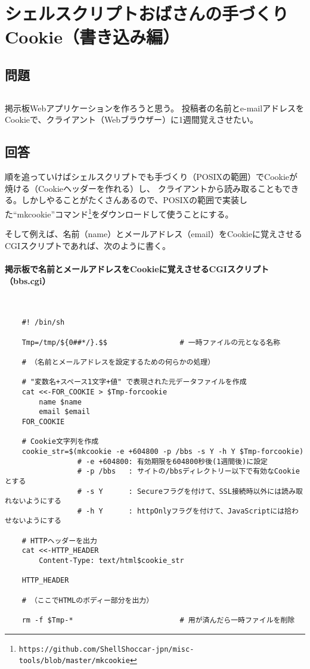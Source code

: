 \section{シェルスクリプトおばさんの手づくりCookie（書き込み編）}
\label{recipe:make_cookie}

\subsection*{問題}
\noindent
$\!\!\!\!\!$
\begin{grshfboxit}{160.0mm}
	掲示板Webアプリケーションを作ろうと思う。
	投稿者の名前とe-mailアドレスをCookieで、クライアント（Webブラウザー）に1週間覚えさせたい。
\end{grshfboxit}

\subsection*{回答}
順を追っていけばシェルスクリプトでも手づくり（POSIXの範囲）でCookieが焼ける（Cookieヘッダーを作れる）し、
クライアントから読み取ることもできる。しかしやることがたくさんあるので、POSIXの範囲で実装した``mkcookie''コマンド\footnote{\verb|https://github.com/ShellShoccar-jpn/misc-tools/blob/master/mkcookie|}をダウンロードして使うことにする。

そして例えば、名前（name）とメールアドレス（email）をCookieに覚えさせるCGIスクリプトであれば、次のように書く。
\paragraph{掲示板で名前とメールアドレスをCookieに覚えさせるCGIスクリプト（bbs.cgi）} 　\\
\begin{frameboxit}{160.0mm}
\begin{verbatim}
	#! /bin/sh
	
	Tmp=/tmp/${0##*/}.$$                 # 一時ファイルの元となる名称
	
	# （名前とメールアドレスを設定するための何らかの処理）
	
	# "変数名+スペース1文字+値" で表現された元データファイルを作成
	cat <<-FOR_COOKIE > $Tmp-forcookie
	    name $name
	    email $email
	FOR_COOKIE
	
	# Cookie文字列を作成
	cookie_str=$(mkcookie -e +604800 -p /bbs -s Y -h Y $Tmp-forcookie)
	             # -e +604800: 有効期限を604800秒後(1週間後)に設定
	             # -p /bbs   : サイトの/bbsディレクトリー以下で有効なCookieとする
	             # -s Y      : Secureフラグを付けて、SSL接続時以外には読み取れないようにする
	             # -h Y      : httpOnlyフラグを付けて、JavaScriptには拾わせないようにする
	
	# HTTPヘッダーを出力
	cat <<-HTTP_HEADER
	    Content-Type: text/html$cookie_str
	    
	HTTP_HEADER
	
	# （ここでHTMLのボディー部分を出力）
	
	rm -f $Tmp-*                         # 用が済んだら一時ファイルを削除
\end{verbatim}
\end{frameboxit}

